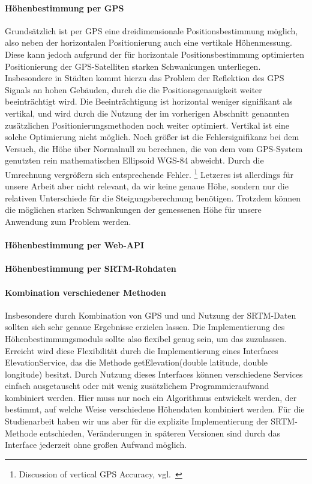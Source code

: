 \paragraph{Höhenbestimmung per GPS}
Grundsätzlich ist per GPS eine dreidimensionale Positionsbestimmung möglich, also neben der horizontalen Positionierung auch eine vertikale Höhenmessung. Diese kann jedoch aufgrund der für horizontale Positionsbestimmung optimierten Positionierung der GPS-Satelliten starken Schwankungen unterliegen. Insbesondere in Städten kommt hierzu das Problem der Reflektion des GPS Signals an hohen Gebäuden, durch die die Positionsgenauigkeit weiter beeinträchtigt wird. Die Beeinträchtigung ist horizontal weniger signifikant als vertikal, und wird durch die Nutzung der im vorherigen Abschnitt genannten zusätzlichen Positionierungsmethoden noch weiter optimiert. Vertikal ist eine solche Optimierung nicht möglich. Noch größer ist die Fehlersignifikanz bei dem Versuch, die Höhe über Normalnull zu berechnen, die von dem vom GPS-System genutzten rein mathematischen Ellipsoid WGS-84 abweicht. Durch die Umrechnung vergrößern sich entsprechende Fehler. \footnote{Discussion of vertical GPS Accuracy, vgl.~\cite{gladstone}} Letzeres ist allerdings für unsere Arbeit aber nicht relevant, da wir keine genaue Höhe, sondern nur die relativen Unterschiede für die Steigungsberechnung benötigen. Trotzdem können die möglichen starken Schwankungen der gemessenen Höhe für unsere Anwendung zum Problem werden.
\paragraph{Höhenbestimmung per Web-API}
\paragraph{Höhenbestimmung per SRTM-Rohdaten}
\paragraph{Kombination verschiedener Methoden}
Insbesondere durch Kombination von GPS und und Nutzung der SRTM-Daten sollten sich sehr genaue Ergebnisse erzielen lassen. Die Implementierung des Höhenbestimmungsmoduls sollte also flexibel genug sein, um das zuzulassen. Erreicht wird diese Flexibilität durch die Implementierung eines Interfaces ElevationService, das die Methode getElevation(double latitude, double longitude) besitzt. Durch Nutzung dieses Interfaces können verschiedene Services einfach ausgetauscht oder mit wenig zusätzlichem Programmieraufwand kombiniert werden. Hier muss nur noch ein Algorithmus entwickelt werden, der bestimmt, auf welche Weise verschiedene Höhendaten kombiniert werden. Für die Studienarbeit haben wir uns aber für die explizite Implementierung der SRTM-Methode entschieden, Veränderungen in späteren Versionen sind durch das Interface jederzeit ohne großen Aufwand möglich.
